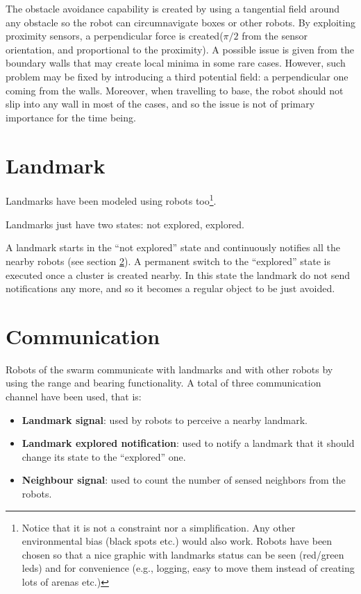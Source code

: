 \smallskip
The obstacle avoidance capability is created by using a tangential field around any obstacle so the robot can circumnavigate boxes or other robots. By exploiting proximity sensors, a perpendicular force is created($\pi/2$ from the sensor orientation, and proportional to the proximity). A possible issue is given from the boundary walls that may create local minima in some rare cases. However, such problem may be fixed by introducing a third potential field: a perpendicular one coming from the walls. Moreover, when travelling to base, the robot should not slip into any wall in most of the cases, and so the issue is not of primary importance for the time being.
 
\section{Landmark}

Landmarks have been modeled using robots too\footnote{Notice that it is not a constraint nor a simplification. Any other environmental bias (black spots etc.) would also work. Robots have been chosen so that a nice graphic with landmarks status can be seen (red/green leds) and for convenience (e.g., logging, easy to move them instead of creating lots of arenas etc.)}.

\noindent
Landmarks just have two states: not explored, explored. 

\noindent
A landmark starts in the ``not explored'' state and continuously notifies all the nearby robots (see section \ref{sec:communication}).
A permanent switch to the ``explored'' state is executed once a cluster is created nearby. In this state the landmark do not send notifications any more, and so it becomes a regular object to be just avoided.


\section{Communication}\label{sec:communication}

\smallskip
Robots of the swarm communicate with landmarks and with other robots by using the range and bearing functionality. A total of three communication channel have been used, that is:

\begin{itemize}

  \item [1] \textbf{Landmark signal}: used by robots to perceive a nearby landmark.
  \item [2] \textbf{Landmark explored notification}: used to notify a landmark that it should change its state to the ``explored'' one.
  \item [3] \textbf{Neighbour signal}: used to count the number of sensed neighbors from the robots. 
 
\end{itemize}

